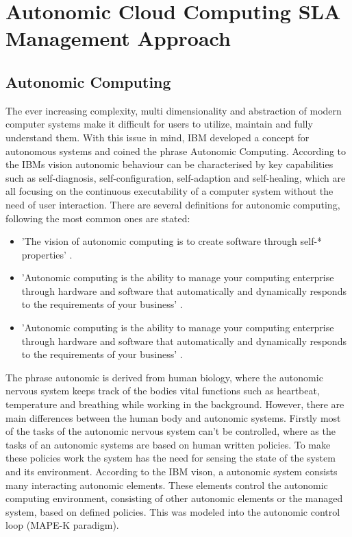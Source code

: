 
\chapter{Autonomic Cloud Computing SLA Management Approach} %
\label{ASLAMaaSApproach} %

\section{Autonomic Computing}
The ever increasing complexity, multi dimensionality and abstraction of modern computer systems make it difficult for users to utilize, maintain and fully understand them. With this issue in mind, IBM \cite{horn2001autonomic} developed a concept for autonomous systems and coined the phrase Autonomic Computing. According to the IBMs vision autonomic behaviour can be characterised by key capabilities such as self-diagnosis, self-configuration, self-adaption and self-healing, which are all focusing on the continuous executability of a computer system without the need of user interaction. There are several definitions for autonomic computing, following the most common ones are stated:

\begin{itemize} 
\item 'The vision of autonomic computing is to create software through self-* properties' \cite{sterritt2005autonomic}.
\item 'Autonomic computing is the ability to manage your computing enterprise
through hardware and software that automatically and dynamically responds to the
requirements of your business' \cite{murch2004autonomic}.
\item 'Autonomic computing is the ability to manage your computing enterprise
through hardware and software that automatically and dynamically responds to the
requirements of your business' \cite{murch2004autonomic}.
\end{itemize} 

The phrase autonomic is derived from human biology, where the autonomic nervous system keeps track of the bodies vital functions such as heartbeat, temperature and breathing  while working in the background. However, there are main differences between the human body and autonomic systems. Firstly most of the tasks of the autonomic nervous system can't be controlled, where as the tasks of an autonomic systems are based on human written policies.
To make these policies work the system has the need for sensing the state of the system and its environment. According to the IBM vison, a autonomic system consists many interacting autonomic elements. These elements control the autonomic computing environment, consisting of other autonomic elements or the managed system, based on defined policies. This was modeled into the autonomic control loop (MAPE-K paradigm).

